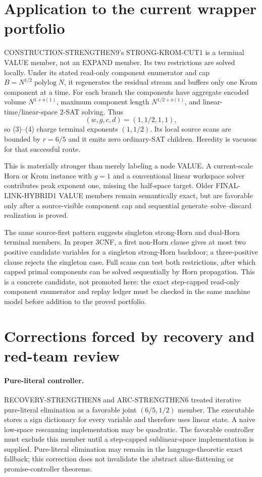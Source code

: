 \documentclass[11pt]{article}
\begin{document}
\section{Application to the current wrapper portfolio}

CONSTRUCTION-STRENGTHEN9's STRONG-KROM-CUT1 is a terminal VALUE member, not
an EXPAND member.  Its two restrictions are solved locally.  Under its stated
read-only component enumerator and cap
$B=N^{1/2}\operatorname{polylog}N$, it regenerates the residual stream and
buffers only one Krom component at a time.  For each branch the components
have aggregate encoded volume $N^{1+o(1)}$, maximum component length
$N^{1/2+o(1)}$, and linear-time/linear-space 2-SAT solving.  Thus
\[
 (w,g,c,d)=(1,1/2,1,1),
\]
so (3)--(4) charge terminal exponents $(1,1/2)$.  Its local source scans are
bounded by $r=6/5$ and it emits zero ordinary-SAT children.  Heredity is
vacuous for that successful route.

This is materially stronger than merely labeling a node VALUE.  A
current-scale Horn or Krom instance with $g=1$ and a conventional linear
workspace solver contributes peak exponent one, missing the half-space
target.  Older FINAL-LINK-HYBRID1 VALUE members remain semantically exact,
but are favorable only after a source-visible component cap and sequential
generate--solve--discard realization is proved.

The same source-first pattern suggests singleton strong-Horn and dual-Horn
terminal members.  In proper 3CNF, a first non-Horn clause gives at most two
positive candidate variables for a singleton strong-Horn backdoor; a
three-positive clause rejects the singleton case.  Full scans can test both
restrictions, after which capped primal components can be solved sequentially
by Horn propagation.  This is a concrete candidate, not promoted here:
the exact step-capped read-only component enumerator and replay ledger must be
checked in the same machine model before addition to the proved portfolio.

\section{Corrections forced by recovery and red-team review}

\paragraph{Pure-literal controller.}
RECOVERY-STRENGTHEN8 and ARC-STRENGTHEN6 treated iterative pure-literal
elimination as a favorable joint $(6/5,1/2)$ member.  The executable stores a
sign dictionary for every variable and therefore uses linear state.  A naive
low-space rescanning implementation may be quadratic.  The favorable
controller must exclude this member until a step-capped sublinear-space
implementation is supplied.  Pure-literal elimination may remain in the
language-theoretic exact fallback; this correction does not invalidate the
abstract alias-flattening or promise-controller theorems.
\end{document}
